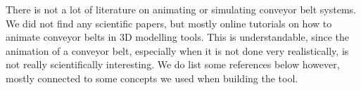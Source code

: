 There is not a lot of literature on animating or simulating conveyor belt systems. We did not find any scientific papers, but mostly online tutorials on how to animate conveyor belts in 3D modelling tools. This is understandable, since the animation of a conveyor belt, especially when it is not done very realistically, is not really scientifically interesting. We do list some references below however, mostly connected to some concepts we used when building the tool.


\tocsection
